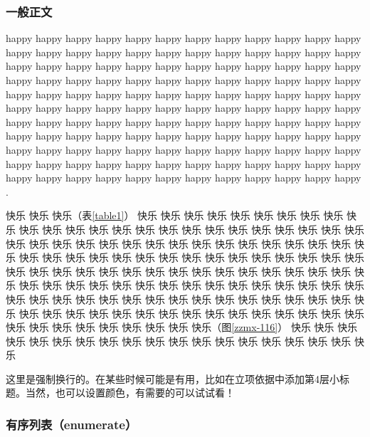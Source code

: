 
\subsubsection{一般正文}

\justifying

\indent\setlength{\parindent}{2em}%

happy happy happy happy happy happy happy happy happy happy happy happy happy happy happy happy happy happy happy happy happy happy happy happy happy happy happy happy happy happy happy happy happy happy happy happy happy happy happy happy happy happy happy happy happy happy happy happy happy happy happy happy happy happy happy happy happy happy happy happy happy happy happy happy happy happy happy happy happy happy happy happy happy happy happy happy happy happy happy happy happy happy happy happy happy happy happy happy happy happy happy happy happy happy happy happy happy happy happy happy happy happy happy happy happy happy happy happy happy happy happy happy happy happy happy happy happy happy happy happy happy happy happy happy happy happy happy happy happy happy happy happy \cite{John1997}.

快乐 快乐 快乐（表\ref{table1}） 快乐 快乐 快乐 快乐 快乐 快乐 快乐 快乐 快乐 快乐 快乐 快乐 快乐 快乐 快乐 快乐 快乐 快乐 快乐 快乐 快乐 快乐 快乐 快乐 快乐 快乐 快乐 快乐 快乐 快乐 快乐 快乐 快乐 快乐 快乐 快乐 快乐 快乐 快乐 快乐 快乐 快乐 快乐 快乐 快乐 快乐 快乐 快乐 快乐 快乐 快乐 快乐 快乐 快乐 快乐 快乐 快乐 快乐 快乐 快乐 快乐 快乐 快乐 快乐 快乐 快乐 快乐 快乐 快乐 快乐 快乐 快乐 快乐 快乐 快乐 快乐 快乐 快乐 快乐 快乐 快乐 快乐 快乐 快乐 快乐 快乐 快乐 快乐 快乐 快乐 快乐 快乐 快乐 快乐 快乐 快乐 快乐 快乐 快乐 快乐 快乐 快乐 快乐 快乐 快乐 快乐 快乐 快乐 快乐 快乐 快乐 快乐 快乐 快乐 快乐 快乐 快乐 快乐 快乐 快乐 快乐 快乐 快乐 快乐 快乐 快乐 快乐（图\ref{zzmx-116}） 快乐 快乐 快乐 快乐 快乐 快乐 快乐 快乐 快乐 快乐 快乐 快乐 快乐 快乐 快乐 快乐 快乐 快乐 快乐 

\indent\setlength{\parindent}{2em}

这里是强制换行的。在某些时候可能是有用，比如在立项依据中添加第4层小标题。当然，也可以设置颜色，有需要的可以试试看！

\subsubsection{有序列表（enumerate）}
\indent\setlength{\parindent}{2em}


